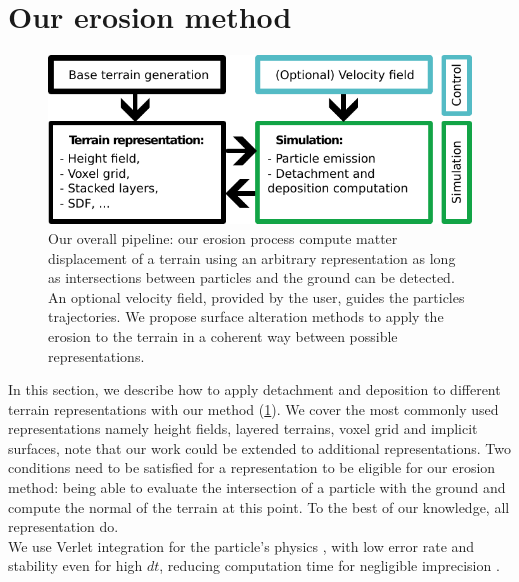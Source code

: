 \section{Our erosion method}
\label{sec:erosion_application_on_representations}
\begin{figure}[ht]
    \centering
    \includegraphics{figure_pipeline.pdf}
    \caption{Our overall pipeline: our erosion process compute matter displacement of a terrain using an arbitrary representation as long as intersections between particles and the ground can be detected. An optional velocity field, provided by the user, guides the particles trajectories. We propose surface alteration methods to apply the erosion to the terrain in a coherent way between possible representations. }
    \label{fig:erosion_figure_pipeline}
\end{figure}
In this section, we describe how to apply detachment and deposition to different terrain representations with our method (\cref{fig:erosion_figure_pipeline}). We cover the most commonly used representations namely height fields, layered terrains, voxel grid and implicit surfaces, note that our work could be extended to additional representations. Two conditions need to be satisfied for a representation to be eligible for our erosion method: being able to evaluate the intersection of a particle with the ground and compute the normal of the terrain at this point. To the best of our knowledge, all representation do. \\
We use Verlet integration for the particle's physics  \cite{Verlet1967}, with low error rate and stability even for high $dt$, reducing computation time for negligible imprecision \cite{Baraff1998, Swope1982}.

